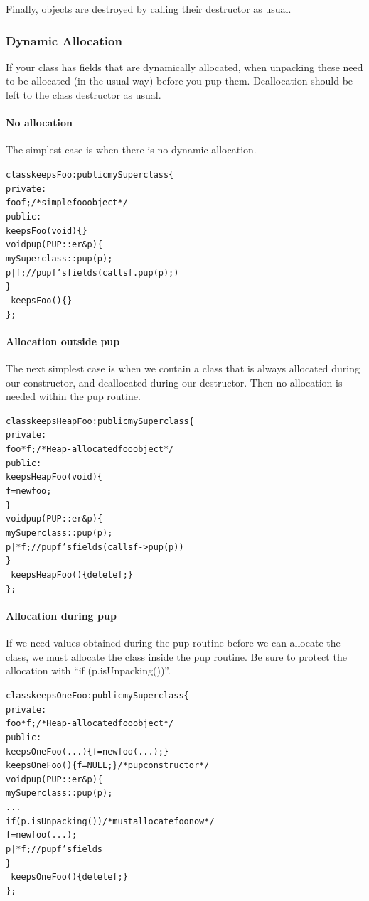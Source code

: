 Finally, objects are destroyed by calling their destructor
as usual.



\subsubsection{Dynamic Allocation}
\label{sec:pupdynalloc}

If your class has fields that are dynamically allocated, when unpacking
these need to be allocated (in the usual way) before you pup them.
Deallocation should be left to the class destructor as usual.

\paragraph{No allocation}
The simplest case is when there is no dynamic allocation.
\begin{alltt}
class keepsFoo : public mySuperclass \{
private:
    foo f; /* simple foo object*/
public:
    keepsFoo(void) \{ \}
    void pup(PUP::er &p) \{
      mySuperclass::pup(p);
      p|f; // pup f's fields (calls f.pup(p);) 
    \}
    ~keepsFoo() \{ \}
\};
\end{alltt}

\paragraph{Allocation outside pup}
The next simplest case is when we contain a class 
that is always allocated during our constructor,
and deallocated during our destructor.  Then no allocation
is needed within the pup routine.
\begin{alltt}
class keepsHeapFoo : public mySuperclass \{
private:
    foo *f; /*Heap-allocated foo object*/
public:
    keepsHeapFoo(void) \{
      f=new foo;
    \}
    void pup(PUP::er &p) \{
      mySuperclass::pup(p);
      p|*f; // pup f's fields (calls f->pup(p))
    \}
    ~keepsHeapFoo() \{delete f;\}
\};
\end{alltt}

\paragraph{Allocation during pup}
If we need values obtained during the pup routine
before we can allocate the class, we must 
allocate the class inside the pup routine.
Be sure to protect the allocation with ``if (p.isUnpacking())''.
\begin{alltt}
class keepsOneFoo : public mySuperclass \{
private:
    foo *f; /*Heap-allocated foo object*/
public:
    keepsOneFoo(...) \{f=new foo(...);\}
    keepsOneFoo() \{f=NULL;\} /* pup constructor */
    void pup(PUP::er &p) \{
      mySuperclass::pup(p);
      ...
      if (p.isUnpacking()) /* must allocate foo now */
         f=new foo(...);
      p|*f;//pup f's fields
    \}
    ~keepsOneFoo() \{delete f;\}
\};
\end{alltt}

